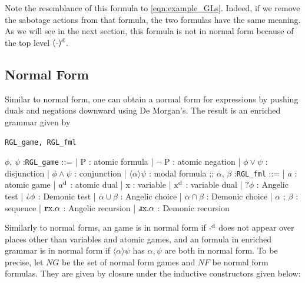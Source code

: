 Note the resemblance of this formula to \autoref{eqn:example_GLs}. Indeed, if we remove the sabotage actions from that formula, the two formulas have the same meaning. As we will see in the next section, this formula is not in normal form because of the top level $(\cdot)^\text{d}$.

\subsection{Normal Form}
\label{subsec:RGL_nml}
Similar to \GLs{} normal form, one can obtain a normal form for \RGL{} expressions by pushing duals and negations downward using De Morgan's. The result is an enriched grammar given by
\begin{center}
\begin{bdefinition}
\label{def:RGL_enriched_syntax}
\texttt{RGL\_game, RGL\_fml}

    \begin {bnf}
        $\phi$, $\psi$ :\texttt{RGL\_game} ::=
        | P : atomic formula
        | $\neg$ P : atomic negation
        | $\phi \vee\psi$ : disjunction
        | $\phi \wedge \psi$ : conjunction
        | $\langle\alpha\rangle \psi$ : modal formula
        ;;
        $\alpha$, $\beta$ :\texttt{RGL\_fml} ::=
        | $a$ : atomic game
        | $a^\text{d}$ : atomic dual
        | x : variable
        | $\text{x}^\text{d}$ : variable dual
        | $?\phi$ : Angelic test
        | $\DTest \phi$ : Demonic test
        | $\alpha\cup\beta$ : Angelic choice
        | $\alpha\cap\beta$ : Demonic choice
        | $\alpha$ ; $\beta$ : sequence
        | $\textbf{r}\text{x}. \alpha$ : Angelic recursion
        | $\DRec\text{x}. \alpha$ : Demonic recursion
    \end{bnf}
\end{bdefinition}
\end{center}

Similarly to \GLs{} normal forms, an \RGL{} game is in normal form if $\cdot^\text{d}$ does not appear over places other than variables and atomic games, and an \RGL{} formula in enriched grammar is in normal form if $\langle \alpha\rangle \psi$ has $\alpha, \psi$ are both in normal form. To be precise, let $NG$ be the set of \RGL{} normal form games and $NF$ be \RGL{} normal form formulas. They are given by closure under the inductive constructors given below:

